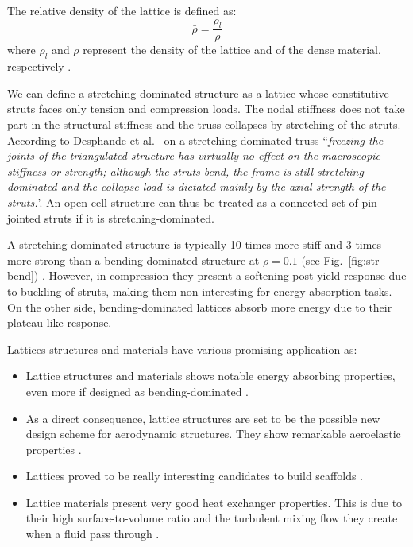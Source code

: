 The relative density of the lattice is defined as:
\begin{equation}
    \bar{\rho} = \frac{\rho_l}{\rho}
\end{equation}
where $\rho_l$ and $\rho$ represent the density of the lattice and of the dense material, respectively .

We can define a stretching-dominated structure as a lattice whose constitutive struts faces only tension and compression loads. The nodal stiffness does not take part in the structural stiffness and the truss collapses by stretching of the struts. According to Desphande et al.~ on a stretching-dominated truss ``\textit{freezing the joints of the triangulated structure has virtually no effect on the macroscopic stiffness or strength; although the struts bend, the frame is still stretching-dominated and the collapse load is dictated mainly by the axial strength of the struts.}'. An open-cell structure can thus be treated as a connected set of pin-jointed struts if it is stretching-dominated.

A stretching-dominated structure is typically 10 times more stiff and 3 times more strong than a bending-dominated structure at $\bar{\rho} = 0.1$ (see Fig.~\ref{fig:str-bend}) \cite{deshpande_foam_2001}. However, in compression they present a softening post-yield response due to buckling of struts, making them non-interesting for energy absorption tasks. On the other side, bending-dominated lattices absorb more energy due to their plateau-like response.


Lattices structures and materials have various promising application as:
\begin{itemize}
    \item Lattice structures and materials shows notable energy absorbing properties, even more if designed as bending-dominated .
    \item As a direct consequence, lattice structures are set to be the possible new design scheme for aerodynamic structures. They show remarkable aeroelastic properties .
    \item Lattices proved to be really interesting candidates to build scaffolds .
    \item Lattice materials present very good heat exchanger properties. This is due to their high surface-to-volume ratio and the turbulent mixing flow they create when a fluid pass through .
\end{itemize}

